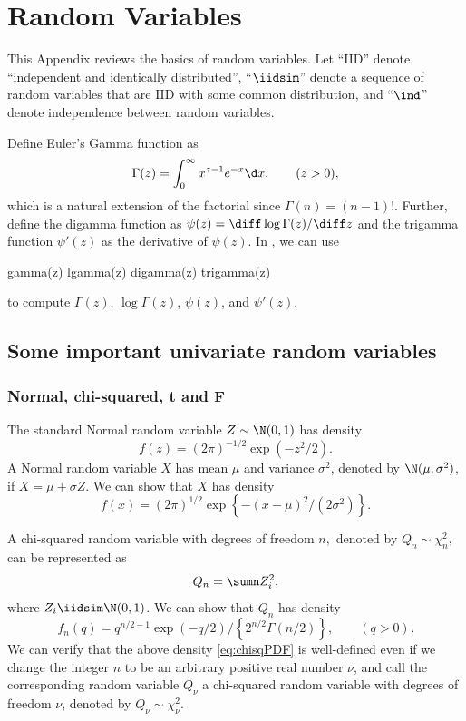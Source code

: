  
\chapter{Random Variables}\label{chapter:appendix-rvs}
 
 
This Appendix reviews the basics of random variables.   
Let ``IID'' denote ``independent and identically distributed'', ``$\iidsim$'' denote a sequence of random variables that are IID with some common distribution, and ``$\ind$'' denote independence between random variables. 


Define Euler's Gamma function as 
$$
\Gamma(z)=\int_{0}^{\infty}x^{z-1}e^{-x}\d x ,\qquad (z>0),
$$
which is a natural extension of the factorial since $\Gamma(n) = (n-1)!$. 
Further, define
the digamma function  as  $\psi(z) = \diff \log  \Gamma (z) / \diff z$ and the trigamma function $\psi'(z)$ as the derivative of $\psi(z)$.  
In , we can use 
\begin{rc}
gamma(z)
lgamma(z)
digamma(z)
trigamma(z)
 \end{rc}
 to compute $\Gamma(z)$, $\log \Gamma(z)$, $\psi(z)$, and $\psi'(z)$. 
 
 

\section{Some important univariate random variables}

\subsection{Normal, chi-squared, t and F} 


The standard Normal random variable $Z\sim\N(0,1)$ has density 
\[
f(z)=(2\pi)^{-1/2}\exp\left(-z^{2}/2\right).
\]
A Normal random variable $X$ has mean $\mu$ and variance $\sigma^{2}$, denoted by $\N(\mu,\sigma^2)$, 
if $X=\mu+\sigma Z$. We can show that $X$ has density 
\[
f(x)=(2\pi)^{1/2}\exp\left\{ -(x-\mu)^{2}/(2\sigma^{2})\right\} .
\]

A chi-squared random variable with degrees of freedom $n,$ denoted
by $Q_{n}\sim\chi_{n}^{2},$ can be represented as 
$$
Q_{n}=\sumn Z_{i}^{2} , 
$$
where $Z_{i} \iidsim \N(0,1)$. We can show that $Q_{n}$ has density 
\begin{equation}
f_{n}(q)=q^{n/2 - 1}\exp(-q/2)\Big/\left\{ 2^{n/2}\Gamma(n/2)\right\} ,\qquad(q>0).\label{eq:chisqPDF}
\end{equation}
We can verify that the above density \eqref{eq:chisqPDF} is well-defined even if we change
the integer $n$ to be an arbitrary positive real number $\nu$, and
call the corresponding random variable $Q_{\nu}$ a chi-squared random
variable with degrees of freedom $\nu$, denoted by $Q_\nu\sim \chi^2_\nu$.


